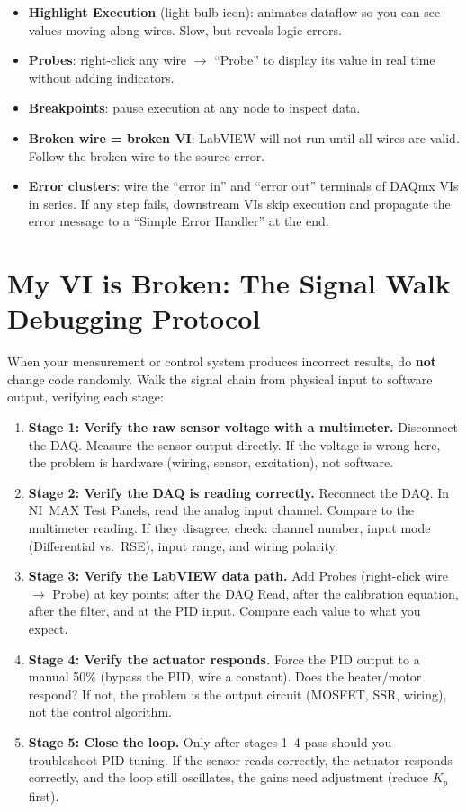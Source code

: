 \documentclass[11pt,letterpaper,twoside,openany]{book}
\begin{document}
\begin{tipbox}
\begin{itemize}[nosep,leftmargin=1.5em]
\item \textbf{Highlight Execution} (light bulb icon): animates dataflow so you can see values moving along wires. Slow, but reveals logic errors.
\item \textbf{Probes}: right-click any wire $\to$ ``Probe'' to display its value in real time without adding indicators.
\item \textbf{Breakpoints}: pause execution at any node to inspect data.
\item \textbf{Broken wire = broken VI}: LabVIEW will not run until all wires are valid. Follow the broken wire to the source error.
\item \textbf{Error clusters}: wire the ``error in'' and ``error out'' terminals of DAQmx VIs in series. If any step fails, downstream VIs skip execution and propagate the error message to a ``Simple Error Handler'' at the end.
\end{itemize}
\end{tipbox}


\section*{My VI is Broken: The Signal Walk Debugging Protocol}

When your measurement or control system produces incorrect results, do \textbf{not} change code randomly. Walk the signal chain from physical input to software output, verifying each stage:

\begin{enumerate}[leftmargin=1.5em]
\item \textbf{Stage 1: Verify the raw sensor voltage with a multimeter.} Disconnect the DAQ. Measure the sensor output directly. If the voltage is wrong here, the problem is hardware (wiring, sensor, excitation), not software.
\item \textbf{Stage 2: Verify the DAQ is reading correctly.} Reconnect the DAQ. In NI~MAX Test Panels, read the analog input channel. Compare to the multimeter reading. If they disagree, check: channel number, input mode (Differential vs.\ RSE), input range, and wiring polarity.
\item \textbf{Stage 3: Verify the LabVIEW data path.} Add Probes (right-click wire $\to$ Probe) at key points: after the DAQ Read, after the calibration equation, after the filter, and at the PID input. Compare each value to what you expect.
\item \textbf{Stage 4: Verify the actuator responds.} Force the PID output to a manual 50\% (bypass the PID, wire a constant). Does the heater/motor respond? If not, the problem is the output circuit (MOSFET, SSR, wiring), not the control algorithm.
\item \textbf{Stage 5: Close the loop.} Only after stages 1--4 pass should you troubleshoot PID tuning. If the sensor reads correctly, the actuator responds correctly, and the loop still oscillates, the gains need adjustment (reduce $K_p$ first).
\end{enumerate}
\end{document}
